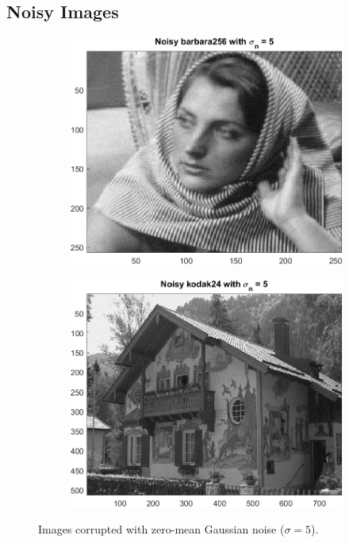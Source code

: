 \documentclass{article}
\begin{document}
\subsection{Noisy Images}
\begin{figure}[H]
    \centering
    \begin{subfigure}[b]{0.45\textwidth}
        \includegraphics[width=\textwidth]{../images/barbara_5.png}
    \end{subfigure}
    \begin{subfigure}[b]{0.45\textwidth}
        \includegraphics[width=\textwidth]{../images/kodak_5.png}
    \end{subfigure}
    \caption{Images corrupted with zero-mean Gaussian noise ($\sigma = 5$).}
\end{figure}
\end{document}
